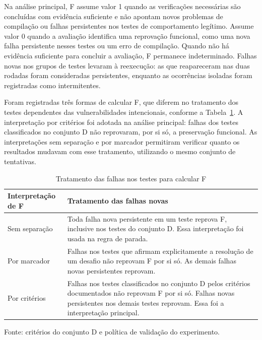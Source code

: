 Na análise principal, F assume valor 1 quando as verificações necessárias são concluídas com evidência suficiente e não apontam novos problemas de compilação ou falhas persistentes nos testes de comportamento legítimo. Assume valor 0 quando a avaliação identifica uma reprovação funcional, como uma nova falha persistente nesses testes ou um erro de compilação. Quando não há evidência suficiente para concluir a avaliação, F permanece indeterminado. Falhas novas nos grupos de testes levaram à reexecução: as que reapareceram nas duas rodadas foram consideradas persistentes, enquanto as ocorrências isoladas foram registradas como intermitentes.

Foram registradas três formas de calcular F, que diferem no tratamento dos testes dependentes das vulnerabilidades intencionais, conforme a Tabela~\ref{tab:interpretacoes-f}. A interpretação por critérios foi adotada na análise principal: falhas dos testes classificados no conjunto D não reprovaram, por si só, a preservação funcional. As interpretações sem separação e por marcador permitiram verificar quanto os resultados mudavam com esse tratamento, utilizando o mesmo conjunto de tentativas.

\begin{table}[H]
\centering
\caption{Tratamento das falhas nos testes para calcular F}
\label{tab:interpretacoes-f}
\renewcommand{\arraystretch}{1.35}
\begin{tabularx}{\textwidth}{|>{\raggedright\arraybackslash}p{}|>{\raggedright\arraybackslash}X|}
\hline
\textbf{Interpretação de F} & \textbf{Tratamento das falhas novas} \\
\hline
Sem separação & Toda falha nova persistente em um teste reprova F, inclusive nos testes do conjunto D. Essa interpretação foi usada na regra de parada. \\
\hline
Por marcador & Falhas nos testes que afirmam explicitamente a resolução de um desafio não reprovam F por si só. As demais falhas novas persistentes reprovam. \\
\hline
Por critérios & Falhas nos testes classificados no conjunto D pelos critérios documentados não reprovam F por si só. Falhas novas persistentes nos demais testes reprovam. Essa foi a interpretação principal. \\
\hline
\end{tabularx}

\vspace{0.2cm}
\begin{minipage}{\textwidth}
    \footnotesize
    Fonte: critérios do conjunto D e política de validação do experimento.
\end{minipage}
\end{table}

